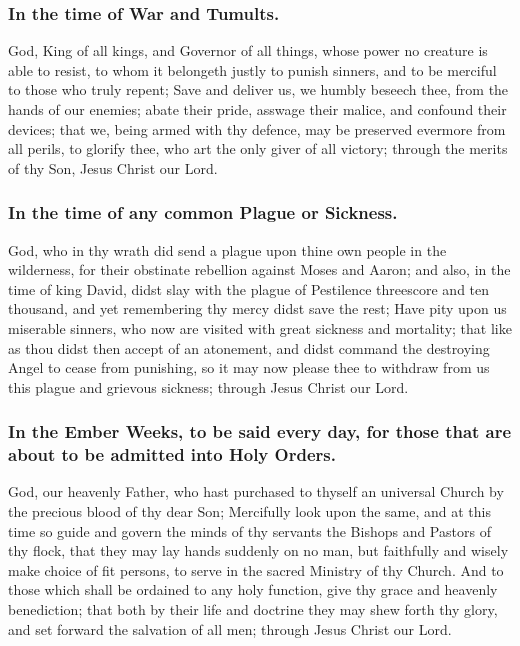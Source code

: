 \subsubsection{In the time of War and Tumults.}
 God, King of all kings, and Governor of all things, whose power no creature is able to resist, to whom it belongeth justly to punish sinners, and to be merciful to those who truly repent; Save and deliver us, we humbly beseech thee, from the hands of our enemies; abate their pride, asswage their malice, and confound their devices; that we, being armed with thy defence, may be preserved evermore from all perils, to glorify thee, who art the only giver of all victory; through the merits of thy Son, Jesus Christ our Lord.

\subsubsection{In the time of any common Plague or Sickness.}
 God, who in thy wrath did send a plague upon thine own people in the wilderness, for their obstinate rebellion against Moses and Aaron; and also, in the time of king David, didst slay with the plague of Pestilence threescore and ten thousand, and yet remembering thy mercy didst save the rest; Have pity upon us miserable sinners, who now are visited with great sickness and mortality; that like as thou didst then accept of an atonement, and didst command the destroying Angel to cease from punishing, so it may now please thee to withdraw from us this plague and grievous sickness; through Jesus Christ our Lord.

\subsubsection{In the Ember Weeks, to be said every day, for those that are about to be admitted into Holy Orders.}
 God, our heavenly Father, who hast purchased to thyself an universal Church by the precious blood of thy dear Son; Mercifully look upon the same, and at this time so guide and govern the minds of thy servants the Bishops and Pastors of thy flock, that they may lay hands suddenly on no man, but faithfully and wisely make choice of fit persons, to serve in the sacred Ministry of thy Church. And to those which shall be ordained to any holy function, give thy grace and heavenly benediction; that both by their life and doctrine they may shew forth thy glory, and set forward the salvation of all men; through Jesus Christ our Lord.

